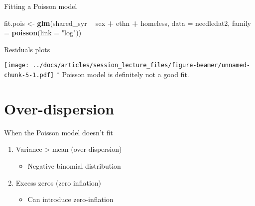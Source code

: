 \documentclass[
  ignorenonframetext,
]{beamer}
\newenvironment{Shaded}{\begin{snugshade}}{\end{snugshade}}
\newcommand{\DataTypeTok}[1]{\textcolor[rgb]{0.13,0.29,0.53}{#1}}
\newcommand{\KeywordTok}[1]{\textcolor[rgb]{0.13,0.29,0.53}{\textbf{#1}}}
\newcommand{\NormalTok}[1]{#1}
\newcommand{\OperatorTok}[1]{\textcolor[rgb]{0.81,0.36,0.00}{\textbf{#1}}}
\newcommand{\StringTok}[1]{\textcolor[rgb]{0.31,0.60,0.02}{#1}}
\providecommand{\tightlist}{%
  \setlength{\itemsep}{0pt}\setlength{\parskip}{0pt}}
\begin{document}
\begin{frame}[fragile]{Fitting a Poisson model}
\protect\hypertarget{fitting-a-poisson-model}{}

\begin{Shaded}
\begin{Highlighting}[]
\NormalTok{fit.pois <-}\StringTok{ }\KeywordTok{glm}\NormalTok{(shared_syr }\OperatorTok{~}\StringTok{ }\NormalTok{sex }\OperatorTok{+}\StringTok{ }\NormalTok{ethn }\OperatorTok{+}\StringTok{ }\NormalTok{homeless,}
                \DataTypeTok{data =}\NormalTok{ needledat2,}
                \DataTypeTok{family =} \KeywordTok{poisson}\NormalTok{(}\DataTypeTok{link =} \StringTok{"log"}\NormalTok{))}
\end{Highlighting}
\end{Shaded}

\end{frame}

\begin{frame}{Residuals plots}
\protect\hypertarget{residuals-plots}{}

\texttt{[image: ../docs/articles/session\_lecture\_files/figure-beamer/unnamed-chunk-5-1.pdf]}
* Poisson model is definitely not a good fit.

\end{frame}

\hypertarget{over-dispersion}{%
\section{Over-dispersion}\label{over-dispersion}}

\begin{frame}{When the Poisson model doesn't fit}
\protect\hypertarget{when-the-poisson-model-doesnt-fit}{}

\begin{enumerate}
\tightlist
\item
  Variance \textgreater{} mean (over-dispersion)

  \begin{itemize}
  \tightlist
  \item
    Negative binomial distribution
  \end{itemize}
\item
  Excess zeros (zero inflation)

  \begin{itemize}
  \tightlist
  \item
    Can introduce zero-inflation
  \end{itemize}
\end{enumerate}

\end{frame}
\end{document}
